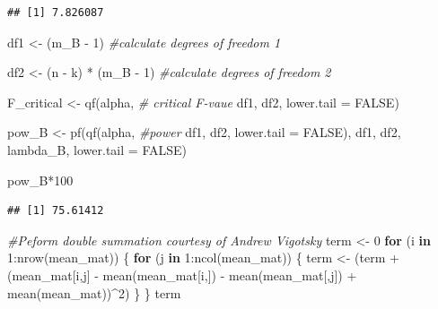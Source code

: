 \documentclass[
]{book}
\newenvironment{Shaded}{\begin{snugshade}}{\end{snugshade}}
\newcommand{\AttributeTok}[1]{\textcolor[rgb]{0.77,0.63,0.00}{#1}}
\newcommand{\CommentTok}[1]{\textcolor[rgb]{0.56,0.35,0.01}{\textit{#1}}}
\newcommand{\ConstantTok}[1]{\textcolor[rgb]{0.00,0.00,0.00}{#1}}
\newcommand{\ControlFlowTok}[1]{\textcolor[rgb]{0.13,0.29,0.53}{\textbf{#1}}}
\newcommand{\DecValTok}[1]{\textcolor[rgb]{0.00,0.00,0.81}{#1}}
\newcommand{\FunctionTok}[1]{\textcolor[rgb]{0.00,0.00,0.00}{#1}}
\newcommand{\NormalTok}[1]{#1}
\newcommand{\OtherTok}[1]{\textcolor[rgb]{0.56,0.35,0.01}{#1}}
\newcommand{\SpecialCharTok}[1]{\textcolor[rgb]{0.00,0.00,0.00}{#1}}
\begin{document}
\begin{verbatim}
## [1] 7.826087
\end{verbatim}

\begin{Shaded}
\begin{Highlighting}[]
\NormalTok{df1 }\OtherTok{\textless{}{-}}\NormalTok{ (m\_B }\SpecialCharTok{{-}} \DecValTok{1}\NormalTok{) }\CommentTok{\#calculate degrees of freedom 1}

\NormalTok{df2 }\OtherTok{\textless{}{-}}\NormalTok{ (n }\SpecialCharTok{{-}}\NormalTok{ k) }\SpecialCharTok{*}\NormalTok{ (m\_B }\SpecialCharTok{{-}} \DecValTok{1}\NormalTok{) }\CommentTok{\#calculate degrees of freedom 2}

\NormalTok{F\_critical }\OtherTok{\textless{}{-}} \FunctionTok{qf}\NormalTok{(alpha, }\CommentTok{\# critical F{-}vaue}
\NormalTok{                 df1,}
\NormalTok{                 df2,}
                 \AttributeTok{lower.tail =} \ConstantTok{FALSE}\NormalTok{) }

\NormalTok{pow\_B }\OtherTok{\textless{}{-}} \FunctionTok{pf}\NormalTok{(}\FunctionTok{qf}\NormalTok{(alpha, }\CommentTok{\#power }
\NormalTok{             df1, }
\NormalTok{             df2, }
             \AttributeTok{lower.tail =} \ConstantTok{FALSE}\NormalTok{), }
\NormalTok{          df1, }
\NormalTok{          df2, }
\NormalTok{          lambda\_B, }
          \AttributeTok{lower.tail =} \ConstantTok{FALSE}\NormalTok{)}


\NormalTok{pow\_B}\SpecialCharTok{*}\DecValTok{100}
\end{Highlighting}
\end{Shaded}

\begin{verbatim}
## [1] 75.61412
\end{verbatim}

\begin{Shaded}
\begin{Highlighting}[]
\CommentTok{\#Peform double summation courtesy of Andrew Vigotsky}
\NormalTok{term }\OtherTok{\textless{}{-}} \DecValTok{0}
\ControlFlowTok{for}\NormalTok{ (i }\ControlFlowTok{in} \DecValTok{1}\SpecialCharTok{:}\FunctionTok{nrow}\NormalTok{(mean\_mat)) \{}
  \ControlFlowTok{for}\NormalTok{ (j }\ControlFlowTok{in} \DecValTok{1}\SpecialCharTok{:}\FunctionTok{ncol}\NormalTok{(mean\_mat)) \{}
\NormalTok{    term }\OtherTok{\textless{}{-}}\NormalTok{ (term }\SpecialCharTok{+}\NormalTok{ (mean\_mat[i,j] }\SpecialCharTok{{-}} 
                       \FunctionTok{mean}\NormalTok{(mean\_mat[i,]) }\SpecialCharTok{{-}} 
                       \FunctionTok{mean}\NormalTok{(mean\_mat[,j]) }\SpecialCharTok{+} \FunctionTok{mean}\NormalTok{(mean\_mat))}\SpecialCharTok{\^{}}\DecValTok{2}\NormalTok{)}
\NormalTok{  \}}
\NormalTok{\}}
\NormalTok{term}
\end{Highlighting}
\end{Shaded}
\end{document}

